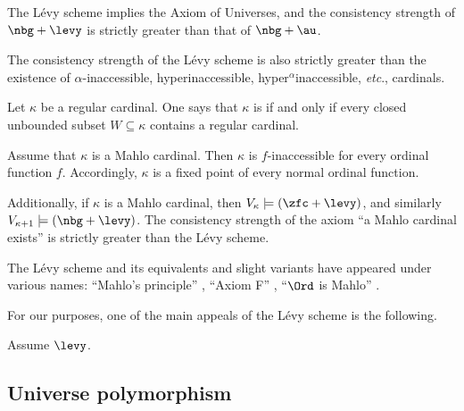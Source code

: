 \begin{nul}
	The Lévy scheme implies the Axiom of Universes,
	and the consistency strength of $ \nbg + \levy $ is strictly greater
	than that of $ \nbg + \au $.

	The consistency strength of the Lévy scheme is
	also strictly greater than
	the existence of $ \alpha $-inaccessible, hyperinaccessible,
	hyper${}^{\alpha}$inaccessible, \emph{etc}., cardinals.
\end{nul}

\begin{definition}
	Let $ \kappa $ be a regular cardinal.
	One says that $ \kappa $ is  if and only if
	every closed unbounded subset $ W \subseteq \kappa $
	contains a regular cardinal.
\end{definition}

\begin{nul}
	Assume that $ \kappa $ is a Mahlo cardinal.
	Then $ \kappa $ is $ f $-inaccessible for every ordinal function $ f $.
	Accordingly, $ \kappa $ is a fixed point of every normal ordinal function.

	Additionally,
	if $ \kappa $ is a Mahlo cardinal, then
	$ V_{\kappa} \models (\zfc + \levy) $, and similarly
	$ V_{\kappa + 1} \models (\nbg + \levy) $.
	The consistency strength of the axiom
	\enquote{a Mahlo cardinal exists}
	is strictly greater than the Lévy scheme.
\end{nul}

\begin{nul}
	The Lévy scheme and its equivalents and slight variants
	have appeared under various names:
	\enquote{Mahlo's principle} \citep{Gloede1973},
	\enquote{Axiom F} \citep{Drake1974},
	\enquote{$ \Ord $ is Mahlo} \citep{Hamkins2003}.
\end{nul}

For our purposes,
one of the main appeals of the Lévy scheme
is the following.

\begin{theorem}
	Assume $ \levy $.
	
\end{theorem}

\subsection{Universe polymorphism}%
\label{sub:universe_polymorphism}




